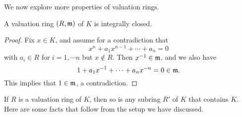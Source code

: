 We now explore more properties of valuation rings.

\begin{prop}
A valuation ring $(R, \mathfrak{m})$ of $K$ is integrally closed.
\end{prop}
\begin{proof}
Fix $x \in K$, and assume for a contradiction that
\[
x^n + a_1x^{n - 1} + \cdots + a_n = 0
\]
with $a_i \in R$ for $i = 1,\cdots n$ but $x \notin R$. Then 
$x^{-1} \in \mathfrak{m}$, and we also have
\[
1 + a_1x^{-1} + \cdots + a_nx^{-n} = 0 \in \mathfrak{m}.
\]
This implies that $1 \in \mathfrak{m}$, a contradiction.
\end{proof}

If $R$ is a valuation ring of $K$, then so is any subring $R'$ of 
$K$ that contains $K$. Here are some facts that follow from the 
setup we have discussed.

